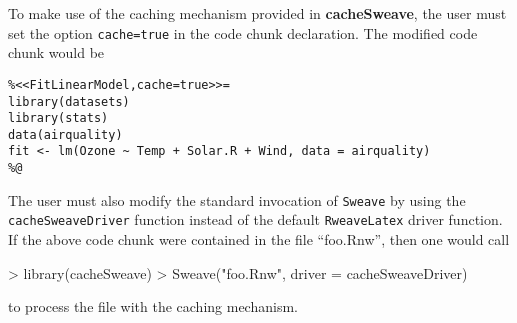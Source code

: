 \documentclass{article}
\newcommand{\code}{\texttt}
\newcommand{\pkg}{\textbf}
\begin{document}
To make use of the caching mechanism provided in \pkg{cacheSweave},
the user must set the option \code{cache=true} in the code chunk
declaration.  The modified code chunk would be
\begin{verbatim}
%<<FitLinearModel,cache=true>>=
library(datasets)
library(stats)
data(airquality)
fit <- lm(Ozone ~ Temp + Solar.R + Wind, data = airquality)
%@
\end{verbatim}
The user must also modify the standard invocation of \code{Sweave} by
using the \code{cacheSweaveDriver} function instead of the default
\code{RweaveLatex} driver function.  If the above code chunk were
contained in the file ``foo.Rnw'', then one would call
\begin{Schunk}
\begin{Sinput}
> library(cacheSweave)
> Sweave("foo.Rnw", driver = cacheSweaveDriver)
\end{Sinput}
\end{Schunk}
to process the file with the caching mechanism.
\end{document}
